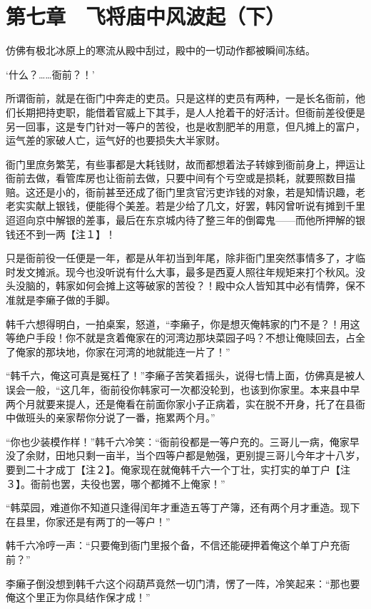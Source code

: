 \section{第七章　飞将庙中风波起（下）}

仿佛有极北冰原上的寒流从殿中刮过，殿中的一切动作都被瞬间冻结。

‘什么？……衙前？！’

所谓衙前，就是在衙门中奔走的吏员。只是这样的吏员有两种，一是长名衙前，他们长期把持吏职，能借着官威上下其手，是人人抢着干的好活计。但衙前差役便是另一回事，这是专门针对一等户的苦役，也是收割肥羊的用意，但凡摊上的富户，运气差的家破人亡，运气好的也要损失大半家财。

衙门里庶务繁芜，有些事都是大耗钱财，故而都想着法子转嫁到衙前身上，押运让衙前去做，看管库房也让衙前去做，只要中间有个亏空或是损耗，就要照数目描赔。这还是小的，衙前甚至还成了衙门里贪官污吏诈钱的对象，若是知情识趣，老老实实献上银钱，便能得个美差。若是少给了几文，好罢，韩冈曾听说有摊到千里迢迢向京中解银的差事，最后在东京城内待了整三年的倒霉鬼——而他所押解的银钱还不到一两【注１】！

只是衙前役一任便是一年，都是从年初当到年尾，除非衙门里突然事情多了，才临时发文摊派。现今也没听说有什么大事，最多是西夏人照往年规矩来打个秋风。没头没脑的，韩家如何会摊上这等破家的苦役？！殿中众人皆知其中必有情弊，保不准就是李癞子做的手脚。

韩千六想得明白，一拍桌案，怒道，“李癞子，你是想灭俺韩家的门不是？！用这等绝户手段！你不就是贪着俺家在的河湾边那块菜园子吗？不想让俺赎回去，占全了俺家的那块地，你家在河湾的地就能连一片了！”

“韩千六，俺这可真是冤枉了！”李癞子苦笑着摇头，说得七情上面，仿佛真是被人误会一般，“这几年，衙前役你韩家可一次都没轮到，也该到你家里。本来县中早两个月就要来提人，还是俺看在前面你家小子正病着，实在脱不开身，托了在县衙中做班头的亲家帮你分说了一番，拖累两个月。”

“你也少装模作样！”韩千六冷笑：“衙前役都是一等户充的。三哥儿一病，俺家早没了余财，田地只剩一亩半，当个四等户都是勉强，更别提三哥儿今年才十八岁，要到二十才成丁【注２】。俺家现在就俺韩千六一个丁壮，实打实的单丁户【注３】。衙前也罢，夫役也罢，哪个都摊不上俺家！”

“韩菜园，难道你不知道只逢得闰年才重造五等丁产簿，还有两个月才重造。现下在县里，你家还是有两丁的一等户！”

韩千六冷哼一声：“只要俺到衙门里报个备，不信还能硬押着俺这个单丁户充衙前？”

李癞子倒没想到韩千六这个闷葫芦竟然一切门清，愣了一阵，冷笑起来：“那也要俺这个里正为你具结作保才成！”

